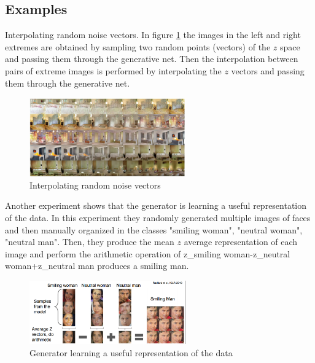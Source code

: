 \subsection*{Examples}
Interpolating random noise vectors. In figure \ref{fig:gans1} the images in the left and right extremes are obtained by sampling two random points (vectors) of the $z$ space and passing them through the generative net. Then the interpolation between pairs of extreme images is performed by interpolating the $z$ vectors and passing them through the generative net.
\begin{figure}[!htb]
  \centering
  \includegraphics[width=0.6\textwidth]{Images/gans/9.png}
  \caption{Interpolating random noise vectors}
  \label{fig:gans1}
\end{figure}

Another experiment shows that the generator is learning a useful representation of the data. In this experiment they randomly generated multiple images of faces and then manually organized in the classes "smiling woman", "neutral woman", "neutral man". Then, they produce the mean $z$ average representation of each image and perform the arithmetic operation of z\_{smiling woman}-z\_{neutral woman}+z\_{neutral man} produces a smiling man.

\begin{figure}[!htb]
  \centering
  \includegraphics[width=0.6\textwidth]{Images/gans/10.png}
  \caption{Generator learning a useful representation of the data}
\end{figure}